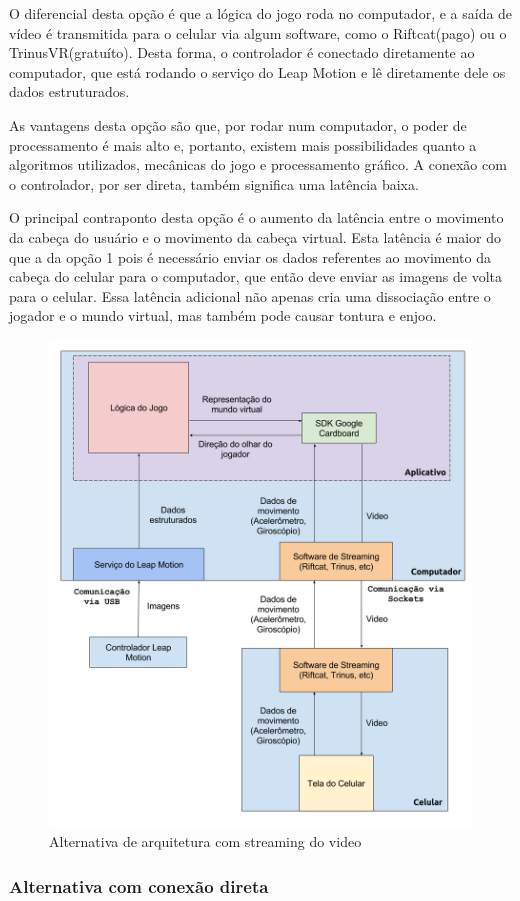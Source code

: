 O diferencial desta opção é que a lógica do jogo roda no computador, e a saída de vídeo é transmitida para o celular via algum software, como o Riftcat(pago) ou o TrinusVR(gratuíto). Desta forma, o controlador é conectado diretamente ao computador, que está rodando o serviço do Leap Motion e lê diretamente dele os dados estruturados.

As vantagens desta opção são que, por rodar num computador, o poder de processamento é mais alto e, portanto, existem mais possibilidades quanto a algoritmos utilizados, mecânicas do jogo e processamento gráfico. A conexão com o controlador, por ser direta, também significa uma latência baixa. 

O principal contraponto desta opção é o aumento da latência entre o movimento da cabeça do usuário e o movimento da cabeça virtual. Esta latência é maior do que a da opção 1 pois é necessário enviar os dados referentes ao movimento da cabeça do celular para o computador, que então deve enviar as imagens de volta para o celular. Essa latência adicional não apenas cria uma dissociação entre o jogador e o mundo virtual, mas também pode causar tontura e enjoo.

\begin{figure}
	\centering
	\includegraphics[width=0.7\linewidth]{images/Arquitetura-leap-pc-riftcat-android}
	\caption{Alternativa de arquitetura com streaming do video}
	\label{fig:Arquitetura-leap-pc-riftcat-android}
\end{figure}

\subsubsection{Alternativa com conexão direta}\label{subsubsec-arquiteturas-leapmotion-android}

